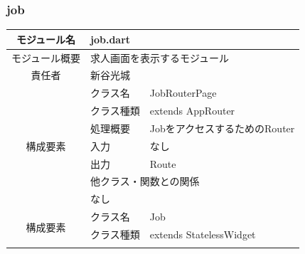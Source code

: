 \clearpage
\subsubsection{job}
\begin{table}[H]
  \centering
  \begin{tabular}{|c|l|l|} \hline
    モジュール名                & \multicolumn{2}{l|}{job.dart}                                                                         \\ \hline
    モジュール概要               & \multicolumn{2}{p{12cm}|}{求人画面を表示するモジュール}                                                             \\ \hline
    責任者                   & \multicolumn{2}{l|}{新谷光城}                                                                             \\ \hline
    \multirow{7}{*}{構成要素} & クラス名                                                 & JobRouterPage                                  \\ \cline{2-3}
                          & クラス種類                                                & extends AppRouter                              \\ \cline{2-3}
                          & 処理概要                                                 & \multicolumn{1}{p{12cm}|}{JobをアクセスするためのRouter} \\ \cline{2-3}
                          & 入力                                                   & なし                                             \\ \cline{2-3}
                          & 出力                                                   & Route                                          \\ \cline{2-3}
                          & \multicolumn{2}{l|}{他クラス・関数との関係}                                                                      \\ \cline{2-3}
                          & \multicolumn{2}{p{14cm}|}{なし}                                                                         \\ \hline
    \multirow{7}{*}{構成要素} & クラス名                                                 & Job                                            \\ \cline{2-3}
                          & クラス種類                                                & extends StatelessWidget                        \\ \cline{2-3}

\end{tabular}
\end{table}
